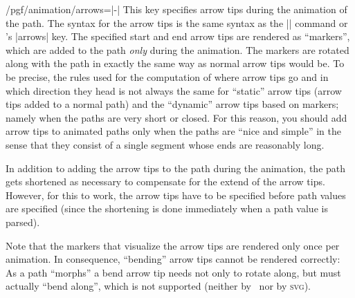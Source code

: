 \begin{key}{/pgf/animation/arrows=|-|}
    This key specifies arrow tips during the animation of the path. The syntax
    for the arrow tips is the same syntax as the |\pgfsetarrow| command or
    \tikzname's |arrows| key. The specified start and end arrow tips are
    rendered as ``markers'', which are added to the path \emph{only} during the
    animation. The markers are rotated along with the path in exactly the same
    way as normal arrow tips would be. To be precise, the rules used for the
    computation of where arrow tips go and in which direction they head is not
    always the same for ``static'' arrow tips (arrow tips added to a normal
    path) and the ``dynamic'' arrow tips based on markers; namely when the
    paths are very short or closed. For this reason, you should add arrow tips
    to animated paths only when the paths are ``nice and simple'' in the sense
    that they consist of a single segment whose ends are reasonably long.

    In addition to adding the arrow tips to the path during the animation, the
    path gets shortened as necessary to compensate for the extend of the arrow
    tips. However, for this to work, the arrow tips have to be specified before
    path values are specified (since the shortening is done immediately when a
    path value is parsed).
\begin{codeexample}[
    preamble={\usepgfmodule{animations}},
    animation list={0,1,2,3,4},
    animation bb={(0.9,-0.1)rectangle(2.1,1.1)},
]
\end{codeexample}

    Note that the markers that visualize the arrow tips are rendered only once
    per animation. In consequence, ``bending'' arrow tips cannot be rendered
    correctly: As a path ``morphs'' a bend arrow tip needs not only to rotate
    along, but must actually ``bend along'', which is not supported (neither by
    \pgfname\ nor by \textsc{svg}).


\end{key}
